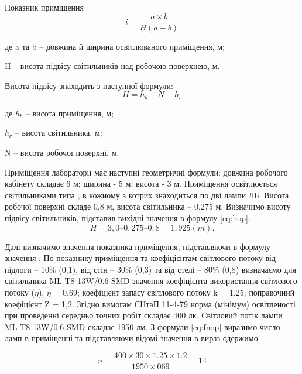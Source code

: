 Показник  приміщення
\begin{equation}
\label{eq:iop}
 i = \frac{a \times b}{H(a+b)}
\end{equation}
\begin{ESKDexplanation}
  \item де a та b – довжина й ширина освітлюваного приміщення, м;  
  \item H – висота підвісу світильників над робочою поверхнею, м.
\end{ESKDexplanation}

Висота підвісу знаходить з наступної формули:
\begin{equation}
\label{eq:hop}
 H =h_{b} - N - h_{c} 
\end{equation}   
\begin{ESKDexplanation}
\item де $h_{b}$ – висота приміщення, м;
\item $h_{с}$ – висота світильника, м;
\item N – висота робочої поверхні, м.
\end{ESKDexplanation}
Приміщення лабораторії має наступні геометричні формули: довжина робочого кабінету складає 6 м;
ширина - 5 м; висота - 3 м.
Приміщення освітлюється світильниками типа , в кожному з котрих знаходиться по дві лампи ЛБ. 
Висота робочої поверхні складе 0,8 м, висота світильника – 0,275 м.
Визначимо висоту підвісу світильників, підставив вихідні значення в формулу \ref{eq:hop}:
\begin{equation}
 H =   3,0 – 0,275 – 0,8 = 1,925(m).
\end{equation}            

Далі визначимо значення показника приміщення, підставляючи в формулу значення :       
По показнику приміщення та коефіцієнтам світлового потоку від підлоги – 10\% (0,1), від стін – 30\% (0,3) та від стелі – 80\% (0,8)
визначаємо для світильника ML-T8-13W/0.6-SMD значення коефіцієнта використання світлового потоку ($\eta$). $\eta$ = 0,69; 
коефіцієнт запасу світлового потоку k = 1,25; поправочний коефіцієнт Z = 1,2.
Згідно вимогам СНтаП 11-4-79 норма (мінімум) освітленості при проведенні середньо точних робіт складає 400 лк.
Світловий потік лампи ML-T8-13W/0.6-SMD складає 1950 лм.
З формули \ref{eq:fnop} виразимо число ламп в приміщенні та підставляючи відомі значення в вираз одержимо
 
\begin{equation}
 n = \frac{400 \times 30 \times 1.25 \times 1.2 }{1950 \times 069} = 14
\end{equation}

